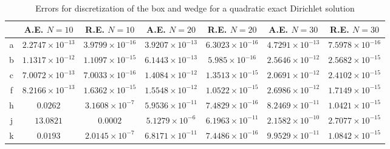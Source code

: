\documentclass[11pt, a4paper]{article}
\theoremstyle{definition}
\begin{document}
\begin{table}
	\caption{Errors for discretization of the box and wedge for a quadratic exact Dirichlet solution}
	\begin{tabular}{ ||c| c| c| c| c |c|c|| }
		\hline
		\hline
		& A.E. $N =10$ & R.E. $N =10$ &A.E. $N =20$ & R.E. $N =20$ &A.E. $N =30$ & R.E. $N =30$ \\ 
		\hline
		a & $ 2.2747\times 10^{-13 }$ & $ 3.9799\times 10^{-16 }$ & $ 3.9207\times 10^{-13 }$ & $6.3023 \times 10^{-16 }$ & $4.7291 \times 10^{- 13}$ & $ 7.5978\times 10^{-16 }$\\  
		b & $ 1.1317\times 10^{-12 }$ & $1.1097 \times 10^{-15}$ & $6.1443 \times 10^{-13 }$ & $ 5.985\times 10^{-16 }$ & $2.5646 \times 10^{- 12}$ & $2.5682 \times 10^{-15 }$\\  
		c & $ 7.0072\times 10^{- 13}$ & $ 7.0033 \times 10^{-16 }$ & $1.4084 \times 10^{-12 }$ & $ 1.3513\times 10^{- 15}$ & $2.0691 \times 10^{- 12}$ & $ 2.4102\times 10^{-15 }$\\  
		f & $ 8.2166\times 10^{- 13}$ & $1.6362\times 10^{- 15} $ & $ 1.5548 \times 10^{-12 } $ & $1.0522 \times 10^{-15 }$ & $2.6986 \times 10^{-12} $ & $ 1.7149\times 10^{- 15}$\\  
	    \hline
		h & $0.0262 $ & $3.1608 \times 10^{-7}$ & $ 5.9536\times 10^{- 11}$ & $7.4829 \times 10^{-16 }$ & $ 8.2469\times 10^{-11}$ & $ 1.0421\times 10^{-15}$\\  
		j & $13.0821 $ & $0.0002 $ & $ 5.1279 \times 10^{- 6}$ & $6.1963 \times 10^{-11 }$ & $2.1582 \times 10^{- 10}$ & $ 2.7077\times 10^{-15}$\\  
		k & $0.0193$ & $ 2.0145\times 10^{- 7}$ & $6.8171 \times 10^{-11 }$ & $ 7.4486\times 10^{-16 }$ & $ 9.9529 \times 10^{-11}$ & $ 1.0842\times 10^{-15}$\\  
		\hline
		\hline
	\end{tabular}
	\label{Tab4}
\end{table}
\end{document}
